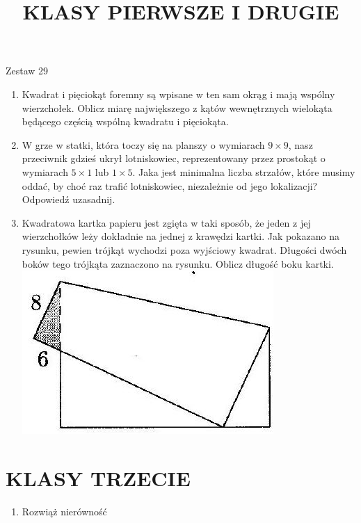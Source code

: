\documentclass[10pt]{article}
\title{KLASY PIERWSZE I DRUGIE }
\author{}
\date{}
\begin{document}
\maketitle
Zestaw 29

\begin{enumerate}
  \item Kwadrat i pięciokąt foremny są wpisane w ten sam okrąg i mają wspólny wierzchołek. Oblicz miarę największego z kątów wewnętrznych wielokąta będącego częścią wspólną kwadratu i pięciokąta.
  \item W grze w statki, która toczy się na planszy o wymiarach \(9 \times 9\), nasz przeciwnik gdzieś ukrył lotniskowiec, reprezentowany przez prostokąt o wymiarach \(5 \times 1\) lub \(1 \times 5\). Jaka jest minimalna liczba strzałów, które musimy oddać, by choć raz trafić lotniskowiec, niezależnie od jego lokalizacji? Odpowiedź uzasadnij.
  \item Kwadratowa kartka papieru jest zgięta w taki sposób, że jeden z jej wierzchołków leży dokładnie na jednej z krawędzi kartki. Jak pokazano na rysunku, pewien trójkąt wychodzi poza wyjściowy kwadrat. Długości dwóch boków tego trójkąta zaznaczono na rysunku. Oblicz długość boku kartki.\\
\includegraphics[max width=\textwidth, center]{2024_11_21_084f8480d7ba530b1ddag-1}
\end{enumerate}

\section*{KLASY TRZECIE}
\begin{enumerate}
  \item Rozwiąż nierówność
\end{enumerate}
\end{document}
